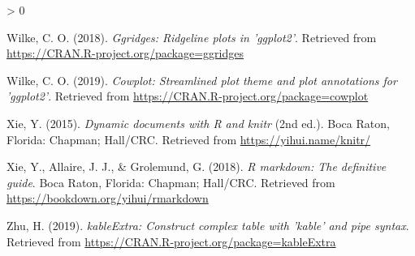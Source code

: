 \documentclass[
  english,
  doc,floatsintext]{apa6}
\newlength{\cslhangindent}
\newenvironment{CSLReferences}[2] %
 {%
  \setlength{\parindent}{0pt}
  \ifodd #1 \everypar{\setlength{\hangindent}{\cslhangindent}}\ignorespaces\fi
  \ifnum #2 > 0
  \setlength{\parskip}{#2\baselineskip}
  \fi
 }%
 {}
\begin{document}
\begin{CSLReferences}{1}{0}
\leavevmode\hypertarget{ref-R-ggridges}{}%
Wilke, C. O. (2018). \emph{Ggridges: Ridgeline plots in 'ggplot2'}. Retrieved from \url{https://CRAN.R-project.org/package=ggridges}

\leavevmode\hypertarget{ref-R-cowplot}{}%
Wilke, C. O. (2019). \emph{Cowplot: Streamlined plot theme and plot annotations for 'ggplot2'}. Retrieved from \url{https://CRAN.R-project.org/package=cowplot}

\leavevmode\hypertarget{ref-R-knitr}{}%
Xie, Y. (2015). \emph{Dynamic documents with {R} and knitr} (2nd ed.). Boca Raton, Florida: Chapman; Hall/CRC. Retrieved from \url{https://yihui.name/knitr/}

\leavevmode\hypertarget{ref-R-rmarkdown}{}%
Xie, Y., Allaire, J. J., \& Grolemund, G. (2018). \emph{R markdown: The definitive guide}. Boca Raton, Florida: Chapman; Hall/CRC. Retrieved from \url{https://bookdown.org/yihui/rmarkdown}

\leavevmode\hypertarget{ref-R-kableExtra}{}%
Zhu, H. (2019). \emph{kableExtra: Construct complex table with 'kable' and pipe syntax}. Retrieved from \url{https://CRAN.R-project.org/package=kableExtra}

\end{CSLReferences}

\endgroup

\newpage
\end{document}
